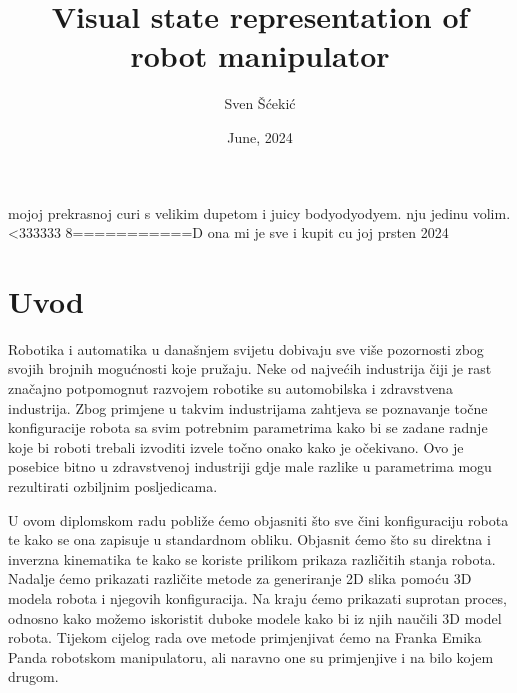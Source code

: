 \documentclass[times, utf8, diplomskirad]{fer}
\title{Visual state representation of robot manipulator}
\author{Sven Šćekić}
\date{June, 2024}
\begin{document}
\maketitle






\begin{zahvale}
    mojoj prekrasnoj curi s velikim dupetom i juicy bodyodyodyem. nju jedinu volim. <333333 8===========D ona mi je sve i kupit cu joj prsten 2024
\end{zahvale}


\mainmatter
{}


\tableofcontents

\setcounter{page}{1}
\mainmatter

\chapter{Uvod}
\label{pog:uvod}
\hspace{\parindent}Robotika i automatika u današnjem svijetu dobivaju sve više pozornosti zbog svojih brojnih mogućnosti koje pružaju.
Neke od najvećih industrija čiji je rast značajno potpomognut razvojem robotike su automobilska i zdravstvena industrija.
Zbog primjene u takvim industrijama zahtjeva se poznavanje točne konfiguracije robota sa svim potrebnim parametrima kako
bi se zadane radnje koje bi roboti trebali izvoditi izvele točno onako kako je očekivano.
Ovo je posebice bitno u zdravstvenoj industriji gdje male razlike u parametrima mogu rezultirati ozbiljnim posljedicama.

U ovom diplomskom radu pobliže ćemo objasniti što sve čini konfiguraciju robota te kako se ona zapisuje u standardnom obliku.
Objasnit ćemo što su direktna i inverzna kinematika te kako se koriste prilikom prikaza različitih stanja robota.
Nadalje ćemo prikazati različite metode za generiranje 2D slika pomoću 3D modela robota i njegovih konfiguracija.
Na kraju ćemo prikazati suprotan proces, odnosno kako možemo iskoristit duboke modele kako bi iz njih naučili 3D model robota.
Tijekom cijelog rada ove metode primjenjivat ćemo na Franka Emika Panda robotskom manipulatoru, ali naravno one su primjenjive i na bilo kojem drugom.
\end{document}
